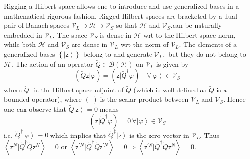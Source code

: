 \documentclass[aps,preprint]{revtex4}%
\begin{document}
Rigging a Hilbert space allows one to introduce and use generalized bases in a
mathematical rigorous fashion. Rigged Hilbert spaces are bracketed by a dual
pair of Banach spaces $\mathcal{V}_{L}\supset\mathcal{H\supset}\mathcal{V}%
_{S}$ so that $\mathcal{H}$ and $\mathcal{V}_{S}.$can be naturally embedded in
$\mathcal{V}_{L}.$ The space $\mathcal{V}_{S}$ is dense in $\mathcal{H}$ wrt
to the Hilbert space norm, while both $\mathcal{H}$ and $\mathcal{V}_{S}$ are
dense in $\mathcal{V}_{L}$ wrt the norm of $\mathcal{V}_{L}$. The elements of
a generalized bases $\left\{  \left\vert \mathsf{z}\right\rangle \right\}  $
belong to and generate $\mathcal{V}_{L},$ but they do not belong to
$\mathcal{H}$. The action of an operator $\breve{Q}\in\mathcal{B}\left(
\mathcal{H}\right)  $ on $\mathcal{V}_{L}$ is given by
\begin{equation}
\left(  \breve{Q}\mathsf{z}|\varphi\right)  =\left(  \mathsf{z}|\breve
{Q}^{\dagger}\varphi\right)  \quad\forall\left\vert \varphi\right\rangle
\in\mathcal{V}_{S}%
\end{equation}
where $\breve{Q}^{\dagger}$ is the Hilbert space adjoint of $\breve{Q}$ (which
is well defined as $\breve{Q}$ is a bounded operator), where $\left(
|\right)  $ is the scalar product between $\mathcal{V}_{L}$ and $\mathcal{V}%
_{S}$. Hence one can observe that $\breve{Q}\left\vert \mathsf{z}\right\rangle
=0$ means
\begin{equation}
\left(  \mathsf{z}|\breve{Q}^{\dagger}\varphi\right)  =0\,\forall\left\vert
\varphi\right\rangle \in\mathcal{V}_{S}%
\end{equation}
i.e. $\breve{Q}^{\dagger}\left\vert \varphi\right\rangle =0$ which implies
that $\breve{Q}^{\ddagger}\left\vert \mathsf{z}\right\rangle $ is the zero
vector in $\mathcal{V}_{L}$. Thus $\left\langle \mathsf{z}^{N}|\breve
{Q}^{\dagger}\breve{Q}\mathsf{z}^{N}\right\rangle =0$ or $\left\langle
\mathsf{z}^{\prime N}|\breve{Q}^{\dagger}\breve{Q}\mathsf{z}^{\prime
N}\right\rangle =0\Rightarrow\left\langle \mathsf{z}^{\prime N}|\breve
{Q}^{\dagger}\breve{Q}\mathsf{z}^{N}\right\rangle =0.$
\end{document}
